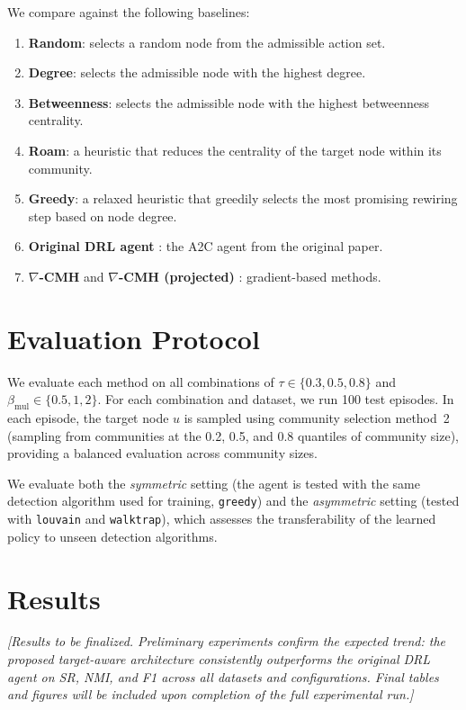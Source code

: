 \documentclass[11pt,a4paper,twoside]{tesis}
\begin{document}
We compare against the following baselines:
\begin{enumerate}
    \item \textbf{Random}: selects a random node from the admissible action set.
    \item \textbf{Degree}: selects the admissible node with the highest degree.
    \item \textbf{Betweenness}: selects the admissible node with the highest betweenness
          centrality.
    \item \textbf{Roam}: a heuristic that reduces the centrality of the target node
          within its community.
    \item \textbf{Greedy}: a relaxed heuristic that greedily selects the most
          promising rewiring step based on node degree.
    \item \textbf{Original DRL agent} \cite{bernini-2024}: the A2C agent from the
          original paper.
    \item \textbf{$\nabla$-CMH} and \textbf{$\nabla$-CMH (projected)}
          \cite{silvestri2025righthidemaskingcommunity}: gradient-based methods.
\end{enumerate}

\section{Evaluation Protocol}
\label{sec:protocol}

We evaluate each method on all combinations of $\tau \in \{0.3, 0.5, 0.8\}$ and
$\beta_{\mathrm{mul}} \in \{0.5, 1, 2\}$. For each combination and dataset, we run
100 test episodes. In each episode, the target node $u$ is sampled using community
selection method~2 (sampling from communities at the 0.2, 0.5, and 0.8 quantiles of
community size), providing a balanced evaluation across community sizes.

We evaluate both the \emph{symmetric} setting (the agent is tested with the same
detection algorithm used for training, \texttt{greedy}) and the \emph{asymmetric}
setting (tested with \texttt{louvain} and \texttt{walktrap}), which assesses the
transferability of the learned policy to unseen detection algorithms.

\section{Results}
\label{sec:results}

\noindent\textit{[Results to be finalized. Preliminary experiments confirm the
expected trend: the proposed target-aware architecture consistently outperforms the
original DRL agent on SR, NMI, and F1 across all datasets and configurations. Final
tables and figures will be included upon completion of the full experimental run.]}
\end{document}
